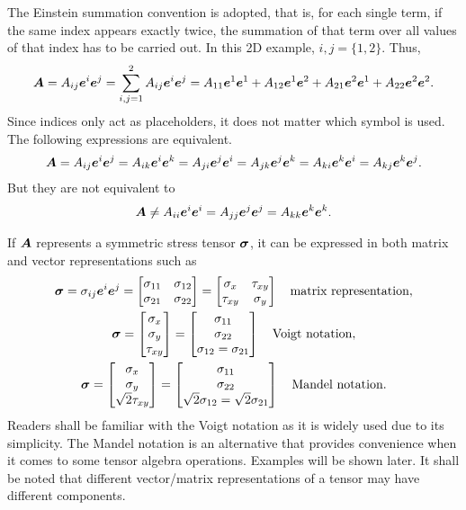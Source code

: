 The Einstein summation convention is adopted, that is, for each single term, if the same index appears exactly twice, the summation of that term over all values of that index has to be carried out.
In this 2D example, $i,j=\{1,2\}$.
Thus,
\begin{gather}
\bm{A}=A_{ij}\bm{e}^i\bm{e}^j=\sum_{i,j=1}^{2}A_{ij}\bm{e}^i\bm{e}^j=A_{11}\bm{e}^1\bm{e}^1+A_{12}\bm{e}^1\bm{e}^2+A_{21}\bm{e}^2\bm{e}^1+A_{22}\bm{e}^2\bm{e}^2.
\end{gather}
Since indices only act as placeholders, it does not matter which symbol is used.
The following expressions are equivalent.
\begin{gather}
\bm{A}=A_{ij}\bm{e}^i\bm{e}^j=A_{ik}\bm{e}^i\bm{e}^k=A_{ji}\bm{e}^j\bm{e}^i=A_{jk}\bm{e}^j\bm{e}^k=A_{ki}\bm{e}^k\bm{e}^i=A_{kj}\bm{e}^k\bm{e}^j.
\end{gather}
But they are not equivalent to
\begin{gather}
\bm{A}\neq{}A_{ii}\bm{e}^i\bm{e}^i=A_{jj}\bm{e}^j\bm{e}^j=A_{kk}\bm{e}^k\bm{e}^k.
\end{gather}

If $\bm{A}$ represents a symmetric stress tensor $\bm{\sigma}$, it can be expressed in both matrix and vector representations such as
\begin{gather}\label{eq:tensor_stress}
\bm{\sigma}=\sigma_{ij}\bm{e}^i\bm{e}^j=\begin{bmatrix}
\sigma_{11}&\sigma_{12}\\
\sigma_{21}&\sigma_{22}
\end{bmatrix}=\begin{bmatrix}
\sigma_x&\tau_{xy}\\
\tau_{xy}&\sigma_y
\end{bmatrix}\quad\text{matrix representation},\\
\bm{\sigma}=\begin{bmatrix}
\sigma_x\\\sigma_y\\\tau_{xy}
\end{bmatrix}=\begin{bmatrix}
\sigma_{11}\\\sigma_{22}\\\sigma_{12}=\sigma_{21}
\end{bmatrix}\quad\text{Voigt notation},\\
\bm{\sigma}=\begin{bmatrix}
\sigma_x\\\sigma_y\\\sqrt{2}\tau_{xy}
\end{bmatrix}=\begin{bmatrix}
\sigma_{11}\\\sigma_{22}\\\sqrt{2}\sigma_{12}=\sqrt{2}\sigma_{21}
\end{bmatrix}\quad\text{Mandel notation}.
\end{gather}
Readers shall be familiar with the Voigt notation as it is widely used due to its simplicity.
The Mandel notation is an alternative that provides convenience when it comes to some tensor algebra operations.
Examples will be shown later.
It shall be noted that different vector/matrix representations of a tensor may have different components.

